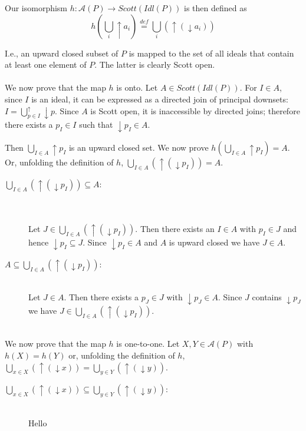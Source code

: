 \documentclass{article}
\newcommand{\defeq}{\overset{\mathit{def}}{=}}
\begin{document}
Our isomorphism $h : \mathcal{A}(P) \to \mathit{Scott}(\mathit{Idl}(P))$ is then defined as
$$ h( \bigcup_i  \uparrow a_i ) \defeq \bigcup_i ( \uparrow (\downarrow a_i) )$$

I.e., an upward closed subset of $P$ is mapped to the set of all ideals that contain at least one element of $P$.
The latter is clearly Scott open.\\~\\
We now prove that the map $h$ is onto. Let $A \in \mathit{Scott}(\mathit{Idl}(P))$. For $I \in A$, since $I$ is an ideal, it can be expressed as a directed join of principal downsets: $I = \bigcup^{\uparrow}_{p \in I}\downarrow p$.
Since $A$ is Scott open, it is inaccessible by directed joins; therefore there exists a $p_I \in I$ such that 
$\downarrow p_I \in A$.  

Then $\bigcup_{I \in A} \uparrow p_I$ is an upward closed set. We now prove $h(\bigcup_{I \in A} \uparrow p_I)=A$. Or, unfolding the definition of $h$, $\bigcup_{I \in A} (\uparrow (\downarrow p_I) ) = A$. 

\begin{description}

\item[$\bigcup_{I \in A} (\uparrow (\downarrow p_I) ) \subseteq A$:]~\\~\\
Let $J \in \bigcup_{I \in A} (\uparrow (\downarrow p_I) )$. Then there exists an $I \in A$ with $p_I \in J$ and hence $\downarrow p_I \subseteq J$. Since $\downarrow p_I \in A$ and $A$ is upward closed we have $J \in A$.

\item[$A \subseteq \bigcup_{I \in A} (\uparrow (\downarrow p_I) )$:]~\\

Let $J \in A$. Then there exists a $p_J \in J$ with $\downarrow p_J \in A$. Since $J$ contains $\downarrow p_J$
we have $J \in \bigcup_{I \in A} (\uparrow (\downarrow p_I) )$.

\end{description}~\\
We now prove that the map $h$ is one-to-one. Let $X,Y \in \mathcal A(P)$ with $h(X) = h(Y)$ or, unfolding the
definition of $h$, $\bigcup_{x \in X} (\uparrow (\downarrow x)) = \bigcup_{y \in Y} (\uparrow (\downarrow y))$.

\begin{description}

\item[$\bigcup_{x \in X} (\uparrow (\downarrow x)) \subseteq \bigcup_{y \in Y} (\uparrow (\downarrow y))$:]~\\

Hello

\end{description}
\end{document}
